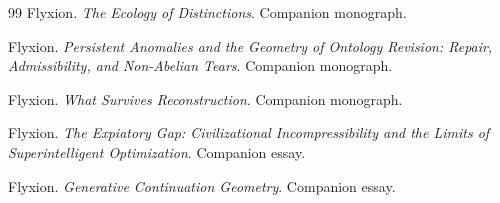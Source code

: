 \documentclass[12pt]{report}
\begin{document}
\begin{thebibliography}{99}
Flyxion. \textit{The Ecology of Distinctions}. Companion monograph.

Flyxion. \textit{Persistent Anomalies and the Geometry of Ontology
Revision: Repair, Admissibility, and Non-Abelian Tears}. Companion
monograph.

Flyxion. \textit{What Survives Reconstruction}. Companion monograph.

Flyxion. \textit{The Expiatory Gap: Civilizational Incompressibility and
the Limits of Superintelligent Optimization}. Companion essay.

Flyxion. \textit{Generative Continuation Geometry}. Companion essay.

\end{thebibliography}
\end{document}
